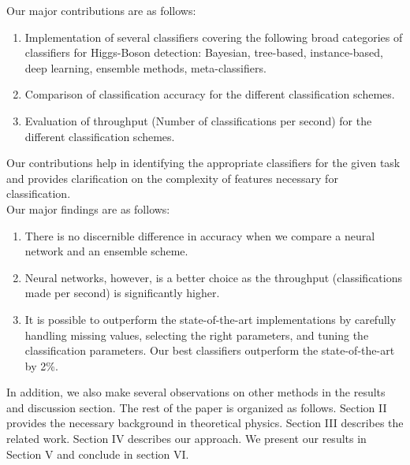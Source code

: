 Our major contributions are as follows:
\begin{enumerate}
\item	Implementation of several classifiers covering the following broad categories of classifiers for Higgs-Boson detection: Bayesian, tree-based, instance-based, deep learning, ensemble methods, meta-classifiers.
\item	Comparison of classification accuracy for the different classification schemes.
\item	Evaluation of throughput (Number of classifications per second) for the different classification schemes.
\end{enumerate}
Our contributions help in identifying the appropriate classifiers for the given task and provides clarification on the complexity of features necessary for classification. \\

Our major findings are as follows: 
\begin{enumerate}
\item	There is no discernible difference in accuracy when we compare a neural network and an ensemble scheme.
\item	Neural networks, however, is a better choice as the throughput (classifications made per second) is significantly higher.
\item	It is possible to outperform the state-of-the-art implementations by carefully handling missing values, selecting the right parameters, and tuning the classification parameters. Our best classifiers outperform the state-of-the-art by 2\%.
\end{enumerate}

In addition, we also make several observations on other methods in the results and discussion section. The rest of the paper is organized as follows. Section II provides the necessary background in theoretical physics. Section III describes the related work. Section IV describes our approach. We present our results in Section V and conclude in section VI.

